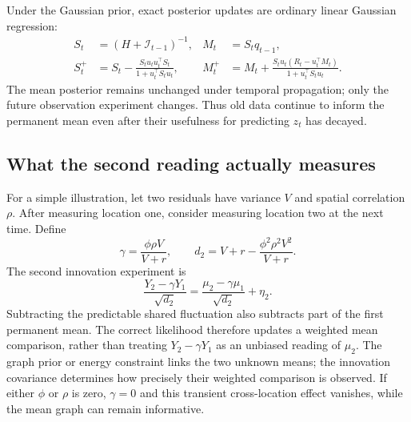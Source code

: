 \documentclass[11pt]{article}
\begin{document}
Under the Gaussian prior, exact posterior updates are ordinary linear Gaussian regression:
\begin{align}
S_t&=(H+\mathcal I_{t-1})^{-1},& M_t&=S_tq_{t-1},\nonumber\\
S_t^+&=S_t-\frac{S_tu_tu_t^\top S_t}{1+u_t^\top S_tu_t},&
M_t^+&=M_t+\frac{S_tu_t(R_t-u_t^\top M_t)}{1+u_t^\top S_tu_t}.
\label{eq:bayes-online}
\end{align}
The mean posterior remains unchanged under temporal propagation; only the future observation experiment changes. Thus old data continue to inform the permanent mean even after their usefulness for predicting $z_t$ has decayed.

\subsection{What the second reading actually measures}
For a simple illustration, let two residuals have variance $V$ and spatial correlation $\rho$. After measuring location one, consider measuring location two at the next time. Define
\[
\gamma=\frac{\phi\rho V}{V+r},\qquad
d_2=V+r-\frac{\phi^2\rho^2V^2}{V+r}.
\]
The second innovation experiment is
\begin{equation}
\boxed{\frac{Y_2-\gamma Y_1}{\sqrt{d_2}}
=\frac{\mu_2-\gamma\mu_1}{\sqrt{d_2}}+\eta_2.}
\label{eq:two-reading-innovation}
\end{equation}
Subtracting the predictable shared fluctuation also subtracts part of the first permanent mean. The correct likelihood therefore updates a weighted mean comparison, rather than treating $Y_2-\gamma Y_1$ as an unbiased reading of $\mu_2$. The graph prior or energy constraint links the two unknown means; the innovation covariance determines how precisely their weighted comparison is observed. If either $\phi$ or $\rho$ is zero, $\gamma=0$ and this transient cross-location effect vanishes, while the mean graph can remain informative.
\end{document}
